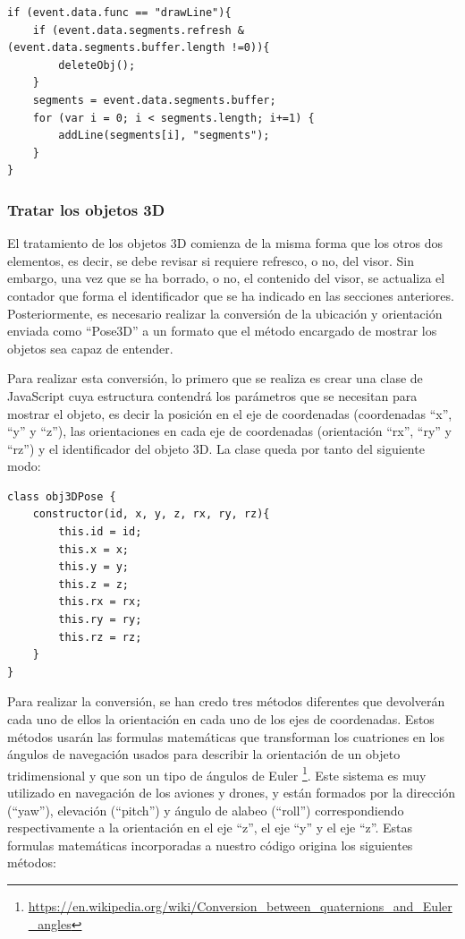 \begin{lstlisting}[frame=single]
if (event.data.func == "drawLine"){
	if (event.data.segments.refresh & (event.data.segments.buffer.length !=0)){
		deleteObj();
	}
	segments = event.data.segments.buffer;
	for (var i = 0; i < segments.length; i+=1) {
		addLine(segments[i], "segments");
	}
}
\end{lstlisting}

\subsubsection{Tratar los objetos 3D}
El tratamiento de los objetos 3D comienza de la misma forma que los otros dos elementos, es decir, se debe revisar si requiere refresco, o no, del visor. Sin embargo, una vez que se ha borrado, o no, el contenido del visor, se actualiza el contador que forma el identificador que se ha indicado en las secciones anteriores. Posteriormente, es necesario realizar la conversión de la ubicación y orientación enviada como ``Pose3D'' a un formato que el método encargado de mostrar los objetos sea capaz de entender.

Para realizar esta conversión, lo primero que se realiza es crear una clase de JavaScript cuya estructura contendrá los parámetros que se necesitan para mostrar el objeto, es decir la posición en el eje de coordenadas (coordenadas ``x'', ``y'' y ``z''), las orientaciones en cada eje de coordenadas (orientación ``rx'', ``ry'' y ``rz'') y el identificador del objeto 3D. La clase queda por tanto del siguiente modo:
\begin{lstlisting}[frame=single]
class obj3DPose {
	constructor(id, x, y, z, rx, ry, rz){
		this.id = id;
		this.x = x;
		this.y = y;
		this.z = z;
		this.rx = rx;
		this.ry = ry;
		this.rz = rz;
	}
}
\end{lstlisting}

Para realizar la conversión, se han credo tres métodos diferentes que devolverán cada uno de ellos la orientación en cada uno de los ejes de coordenadas. Estos métodos usarán las formulas matemáticas que transforman los cuatriones en los ángulos de navegación usados para describir la orientación de un objeto tridimensional y que son un tipo de ángulos de Euler \footnote{\url{https://en.wikipedia.org/wiki/Conversion_between_quaternions_and_Euler_angles}}. Este sistema es muy utilizado en navegación de los aviones y drones, y están formados por la dirección (``yaw''), elevación (``pitch'') y ángulo de alabeo (``roll'') correspondiendo respectivamente a la orientación en el eje ``z'', el eje ``y'' y el eje ``z''. Estas formulas matemáticas incorporadas a nuestro código origina los siguientes métodos:

